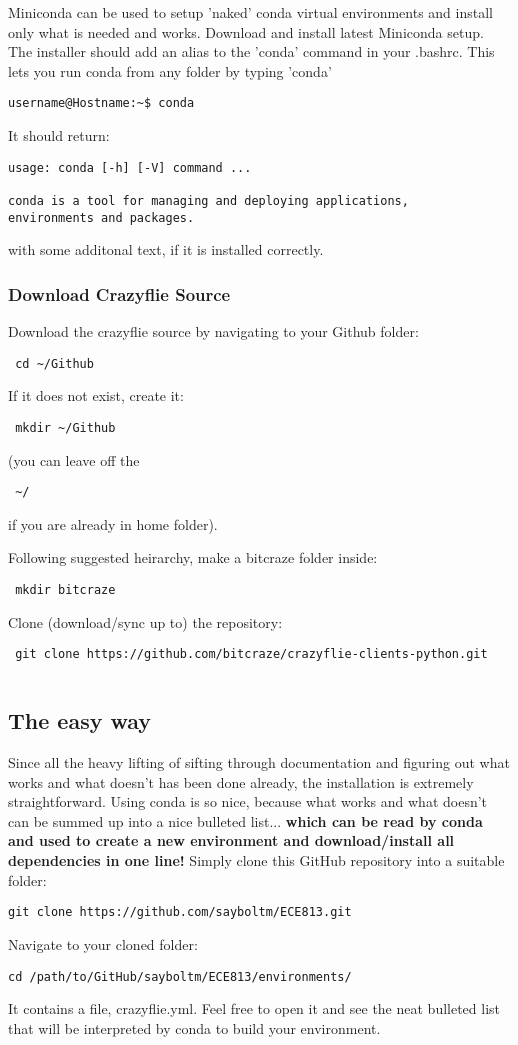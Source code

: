 \documentclass[12pt]{article}
\begin{document}
Miniconda can be used to setup 'naked' conda virtual environments and install only what is needed and works. Download and install latest Miniconda setup. The installer should add an alias to the 'conda' command in your .bashrc. This lets you run conda from any folder by typing 'conda'
\begin{verbatim}
username@Hostname:~$ conda
\end{verbatim}
It should return:
\begin{verbatim}
usage: conda [-h] [-V] command ...

conda is a tool for managing and deploying applications, 
environments and packages.
\end{verbatim}
with some additonal text, if it is installed correctly.

\subsubsection{Download Crazyflie Source}
Download the crazyflie source by navigating to your Github folder:
\begin{verbatim} cd ~/Github \end{verbatim}
If it does not exist, create it:

\begin{verbatim} mkdir ~/Github \end{verbatim}
(you can leave off the \begin{verbatim} ~/ \end{verbatim} if you are already in home folder).

Following suggested heirarchy, make a bitcraze folder inside:
\begin{verbatim} mkdir bitcraze \end{verbatim}
Clone (download/sync up to) the repository:
\begin{verbatim} git clone https://github.com/bitcraze/crazyflie-clients-python.git \end{verbatim}

\begin{verbatim} \end{verbatim}
\subsection{The easy way}
Since all the heavy lifting of sifting through documentation and figuring out what works and what doesn't has been done already, the installation is extremely straightforward. Using conda is so nice, because what works and what doesn't can be summed up into a nice bulleted list... \textbf{which can be read by conda and used to create a new environment and download/install all dependencies in one line!}
Simply clone this GitHub repository into a suitable folder:
\begin{verbatim}
git clone https://github.com/sayboltm/ECE813.git
\end{verbatim}
Navigate to your cloned folder:
\begin{verbatim}
cd /path/to/GitHub/sayboltm/ECE813/environments/
\end{verbatim}
It contains a file, crazyflie.yml. Feel free to open it and see the neat bulleted list that will be interpreted by conda to build your environment.
\end{document}
